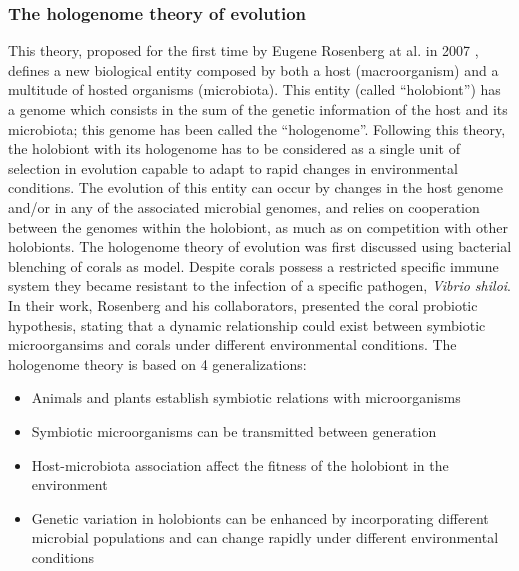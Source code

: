 \subsubsection{The hologenome theory of evolution}
This theory, proposed for the first time by Eugene Rosenberg at al. in 2007 \cite{rosenberg2007role}, defines a new biological entity composed by both a host (macroorganism) and a multitude of hosted organisms (microbiota). This entity (called ``holobiont'') has a genome which consists in the sum of the genetic information of the host and its microbiota; this genome has been called the ``hologenome''. Following this theory, the holobiont with its hologenome has to be considered as a single unit of selection in evolution capable to adapt to rapid changes in environmental conditions. The evolution of this entity can occur by changes in the host genome and/or in any of the associated microbial genomes, and relies on cooperation between the genomes within the holobiont, as much as on competition with other holobionts. The hologenome theory of evolution was first discussed using bacterial blenching of corals as model. Despite corals possess a restricted specific immune system they became resistant to the infection of a specific pathogen, \textit{Vibrio shiloi}. In their work, Rosenberg and his collaborators, presented the coral probiotic hypothesis, stating that a dynamic relationship could exist between symbiotic microorgansims and corals under different environmental conditions. The hologenome theory is based on 4 generalizations:
\vspace{-3mm}
\begin{itemize}[nosep]
\item Animals and plants establish symbiotic relations with microorganisms
\item Symbiotic microorganisms can be transmitted between generation
\item Host-microbiota association affect the fitness of the holobiont in the environment
\item Genetic variation in holobionts can be enhanced by incorporating different microbial populations and can change rapidly under different environmental conditions
\end{itemize}

